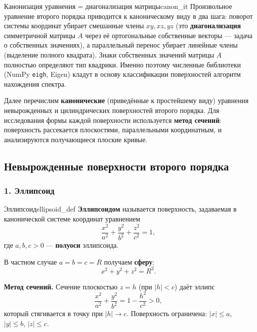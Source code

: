 \documentclass[12pt,a4paper]{article}
\begin{document}
\begin{remarkIT}{Канонизация уравнения = диагонализация матрицы}{canon_it}
  Произвольное уравнение второго порядка приводится к каноническому
  виду в два шага: поворот системы координат убирает смешанные члены
  $xy, xz, yz$ (это \textbf{диагонализация} симметричной матрицы $A$
    через её ортогональные собственные векторы — задача о собственных
  значениях), а параллельный перенос убирает линейные члены (выделение
  полного квадрата). Знаки собственных значений матрицы $A$ полностью
  определяют тип квадрики. Именно поэтому численные библиотеки
  (NumPy \texttt{eigh}, Eigen) кладут в основу классификации
  поверхностей алгоритм нахождения спектра.
\end{remarkIT}

Далее перечислим \textbf{канонические} (приведённые к простейшему
виду) уравнения невырожденных и цилиндрических поверхностей второго
порядка. Для исследования формы каждой поверхности используется
\textbf{метод сечений}: поверхность рассекается плоскостями,
параллельными координатным, и анализируются получающиеся плоские
кривые.

\subsection*{Невырожденные поверхности второго порядка}

\subsubsection*{1. Эллипсоид}

\begin{definition}{Эллипсоид}{ellipsoid_def}
  \textbf{Эллипсоидом} называется поверхность, задаваемая в
  канонической системе координат уравнением
  \begin{equation}
    \frac{x^2}{a^2} + \frac{y^2}{b^2} + \frac{z^2}{c^2} = 1, \tag{11.3}
  \end{equation}
  где $a, b, c > 0$ — \textbf{полуоси} эллипсоида.

  В частном случае $a = b = c = R$ получаем \textbf{сферу}:
  \begin{equation}
    x^2 + y^2 + z^2 = R^2. \tag{11.4}
  \end{equation}

  \textbf{Метод сечений.} Сечение плоскостью $z = h$ (при $|h| < c$)
  даёт эллипс
  \[
    \frac{x^2}{a^2} + \frac{y^2}{b^2} = 1 - \frac{h^2}{c^2} > 0,
  \]
  который стягивается в точку при $|h| \to c$. Поверхность
  ограничена: $|x| \le a$, $|y| \le b$, $|z| \le c$.
\end{definition}
\end{document}
